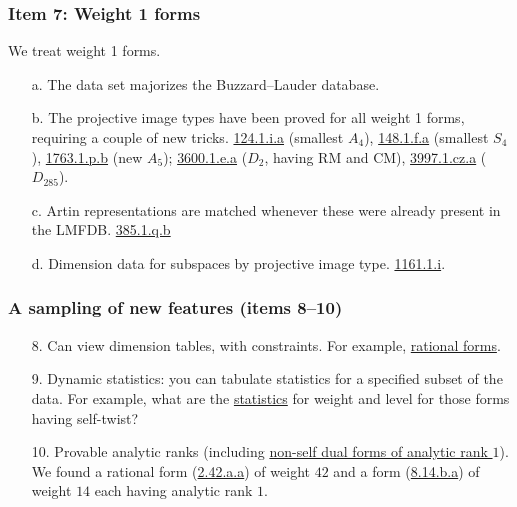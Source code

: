 \documentclass[xcolor=dvipsnames]{beamer}
\theoremstyle{plain}
\begin{document}
\begin{frame}[plain]
\frametitle{Item 7: Weight 1 forms} \pause

We treat weight 1 forms.  \pause 

\begin{enumerate}
\item[a.] The data set majorizes the Buzzard--Lauder database. \pause
\item[b.] The projective image types have been proved for all weight 1 forms, requiring a couple of new tricks.  \href{http://cmfs.lmfdb.xyz/ModularForm/GL2/Q/holomorphic/124/1/i/a/}{124.1.i.a} (smallest $A_4$), \href{http://cmfs.lmfdb.xyz/ModularForm/GL2/Q/holomorphic/148/1/f/a/}{148.1.f.a} (smallest $S_4$), \href{http://cmfs.lmfdb.xyz/ModularForm/GL2/Q/holomorphic/1763/1/p/b/}{1763.1.p.b} (new $A_5$); \href{http://cmfs.lmfdb.xyz/ModularForm/GL2/Q/holomorphic/3600/1/e/a/}{3600.1.e.a} ($D_2$, having RM and CM), \href{http://cmfs.lmfdb.xyz/ModularForm/GL2/Q/holomorphic/3997/1/cz/a/}{3997.1.cz.a} ($D_{285}$). \pause
\item[c.] Artin representations are matched whenever these were already present in the LMFDB. \href{http://cmfs.lmfdb.xyz/ModularForm/GL2/Q/holomorphic/385/1/q/b/}{385.1.q.b} \pause 
\item[d.] Dimension data for subspaces by projective image type.  \href{http://cmfs.lmfdb.xyz/ModularForm/GL2/Q/holomorphic/1161/1/i/}{1161.1.i}.  
\end{enumerate}

\end{frame}

\begin{frame}[plain]
\frametitle{A sampling of new features (items 8--10)} \pause

\begin{enumerate}
\item[8.] Can view dimension tables, with constraints.  For example, \href{http://cmfs.lmfdb.xyz/ModularForm/GL2/Q/holomorphic/?count=None&hidden_search_type=Dimensions&level=1-48&weight=1-12&dim=1&search_type=Dimensions}{rational forms}. \pause
\item[9.] Dynamic statistics: you can tabulate statistics for a specified subset of the data.  For example, what are the \href{http://cmfs.lmfdb.xyz/ModularForm/GL2/Q/holomorphic/dynamic_stats}{statistics} for weight and level for those forms having self-twist? \pause
\item[10.] Provable analytic ranks (including \href{http://cmfs.lmfdb.xyz/ModularForm/GL2/Q/holomorphic/?is_self_dual=no&count=50&analytic_rank=1&search_type=List}{non-self dual forms of analytic rank $1$}).  \pause  We found a rational form (\href{http://cmfs.lmfdb.xyz/ModularForm/GL2/Q/holomorphic/2/42/a/a/}{2.42.a.a}) of weight $42$ and a form (\href{http://cmfs.lmfdb.xyz/ModularForm/GL2/Q/holomorphic/8/14/b/a/}{8.14.b.a}) of weight $14$ each having analytic rank $1$.
\end{enumerate}

\end{frame}
\end{document}
